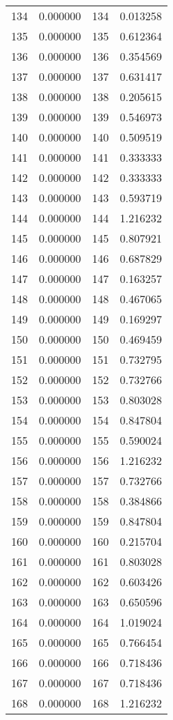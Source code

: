 \documentclass[12pt]{article}
\begin{document}
\begin{longtable}{@{}cccc@{}}
134 & 0.000000 & 134 & 0.013258 \\
135 & 0.000000 & 135 & 0.612364 \\
136 & 0.000000 & 136 & 0.354569 \\
137 & 0.000000 & 137 & 0.631417 \\
138 & 0.000000 & 138 & 0.205615 \\
139 & 0.000000 & 139 & 0.546973 \\
140 & 0.000000 & 140 & 0.509519 \\
141 & 0.000000 & 141 & 0.333333 \\
142 & 0.000000 & 142 & 0.333333 \\
143 & 0.000000 & 143 & 0.593719 \\
144 & 0.000000 & 144 & 1.216232 \\
145 & 0.000000 & 145 & 0.807921 \\
146 & 0.000000 & 146 & 0.687829 \\
147 & 0.000000 & 147 & 0.163257 \\
148 & 0.000000 & 148 & 0.467065 \\
149 & 0.000000 & 149 & 0.169297 \\
150 & 0.000000 & 150 & 0.469459 \\
151 & 0.000000 & 151 & 0.732795 \\
152 & 0.000000 & 152 & 0.732766 \\
153 & 0.000000 & 153 & 0.803028 \\
154 & 0.000000 & 154 & 0.847804 \\
155 & 0.000000 & 155 & 0.590024 \\
156 & 0.000000 & 156 & 1.216232 \\
157 & 0.000000 & 157 & 0.732766 \\
158 & 0.000000 & 158 & 0.384866 \\
159 & 0.000000 & 159 & 0.847804 \\
160 & 0.000000 & 160 & 0.215704 \\
161 & 0.000000 & 161 & 0.803028 \\
162 & 0.000000 & 162 & 0.603426 \\
163 & 0.000000 & 163 & 0.650596 \\
164 & 0.000000 & 164 & 1.019024 \\
165 & 0.000000 & 165 & 0.766454 \\
166 & 0.000000 & 166 & 0.718436 \\
167 & 0.000000 & 167 & 0.718436 \\
168 & 0.000000 & 168 & 1.216232 \\

\end{longtable}
\end{document}
